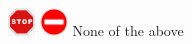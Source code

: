 \documentclass{exam}
\begin{document}
\begin{questions}
\begin{oneparchoices}
 \choice \includegraphics[height=2em]{stopsign}\newline
 \choice \includegraphics[height=2em]{noentry}\newline
 \choice None of the above\newline
\end{oneparchoices}
\newline\end{questions}
\end{document}
